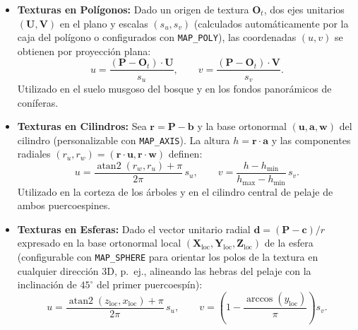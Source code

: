 \documentclass[11pt,letterpaper]{article}
\begin{document}
\begin{itemize}[leftmargin=1.5em]
    \item \textbf{Texturas en Polígonos:} Dado un origen de textura $\mathbf{O}_t$, dos ejes unitarios $(\mathbf{U}, \mathbf{V})$ en el plano y escalas $(s_u, s_v)$ (calculados automáticamente por la caja del polígono o configurados con \texttt{MAP\_POLY}), las coordenadas $(u, v)$ se obtienen por proyección plana:
    \[
        u = \frac{(\mathbf{P} - \mathbf{O}_t)\cdot\mathbf{U}}{s_u}, \qquad
        v = \frac{(\mathbf{P} - \mathbf{O}_t)\cdot\mathbf{V}}{s_v}.
    \]
    Utilizado en el suelo musgoso del bosque y en los fondos panorámicos de coníferas.

    \item \textbf{Texturas en Cilindros:} Sea $\mathbf{r} = \mathbf{P} - \mathbf{b}$ y la base ortonormal $(\mathbf{u}, \mathbf{a}, \mathbf{w})$ del cilindro (personalizable con \texttt{MAP\_AXIS}). La altura $h = \mathbf{r}\cdot\mathbf{a}$ y las componentes radiales $(r_u, r_w) = (\mathbf{r}\cdot\mathbf{u}, \mathbf{r}\cdot\mathbf{w})$ definen:
    \[
        u = \frac{\operatorname{atan2}(r_w, r_u) + \pi}{2\pi}\,s_u, \qquad
        v = \frac{h - h_{\min}}{h_{\max} - h_{\min}}\,s_v.
    \]
    Utilizado en la corteza de los árboles y en el cilindro central de pelaje de ambos puercoespines.

    \item \textbf{Texturas en Esferas:} Dado el vector unitario radial $\mathbf{d} = (\mathbf{P} - \mathbf{c})/r$ expresado en la base ortonormal local $(\mathbf{X}_{\text{loc}}, \mathbf{Y}_{\text{loc}}, \mathbf{Z}_{\text{loc}})$ de la esfera (configurable con \texttt{MAP\_SPHERE} para orientar los polos de la textura en cualquier dirección 3D, p.\ ej., alineando las hebras del pelaje con la inclinación de $45^\circ$ del primer puercoespín):
    \[
        u = \frac{\operatorname{atan2}(z_{\text{loc}}, x_{\text{loc}}) + \pi}{2\pi}\,s_u, \qquad
        v = \left(1 - \frac{\arccos(y_{\text{loc}})}{\pi}\right) s_v.
    \]


\end{itemize}
\end{document}
